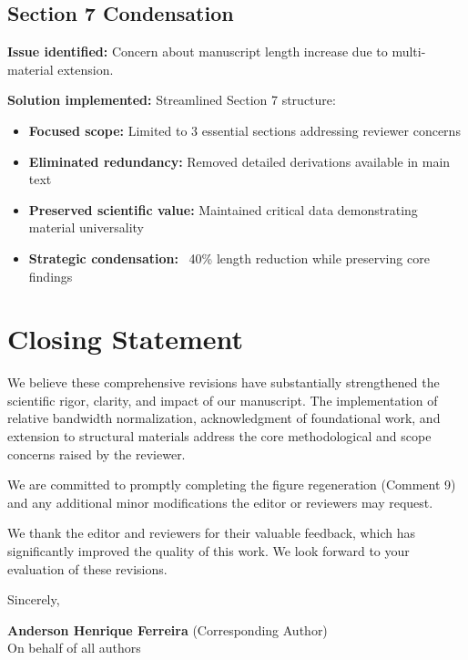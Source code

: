 \documentclass[11pt,a4paper]{article}
\begin{document}
\subsection*{Section 7 Condensation}

\textbf{Issue identified:} Concern about manuscript length increase due to multi-material extension.

\textbf{Solution implemented:} Streamlined Section 7 structure:
\begin{itemize}
    \item \textbf{Focused scope:} Limited to 3 essential sections addressing reviewer concerns
    \item \textbf{Eliminated redundancy:} Removed detailed derivations available in main text
    \item \textbf{Preserved scientific value:} Maintained critical data demonstrating material universality
    \item \textbf{Strategic condensation:} ~40\% length reduction while preserving core findings
\end{itemize}

\section*{Closing Statement}

We believe these comprehensive revisions have substantially strengthened the scientific rigor, clarity, and impact of our manuscript. The implementation of relative bandwidth normalization, acknowledgment of foundational work, and extension to structural materials address the core methodological and scope concerns raised by the reviewer.

We are committed to promptly completing the figure regeneration (Comment 9) and any additional minor modifications the editor or reviewers may request.

We thank the editor and reviewers for their valuable feedback, which has significantly improved the quality of this work. We look forward to your evaluation of these revisions.

\vspace{1cm}

Sincerely,

\vspace{1cm}

\textbf{Anderson Henrique Ferreira} (Corresponding Author)\\
On behalf of all authors
\end{document}
